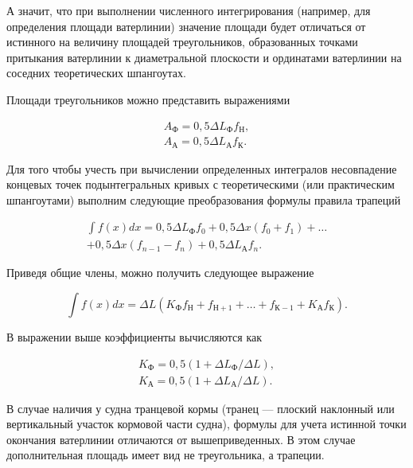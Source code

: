 А значит, что при выполнении численного интегрирования (например, для определения площади ватерлинии) значение площади будет отличаться от истинного на величину площадей треугольников, образованных точками притыкания ватерлинии к диаметральной плоскости и ординатами ватерлинии на соседних теоретических шпангоутах.

Площади треугольников можно представить выражениями

\begin{equation}
    \begin{split}
    A_{\text{Ф}} = 0{,}5 \Delta L_{\text{Ф}} f_{\text{Н}}, \\
    A_{\text{А}} = 0{,}5 \Delta L_{\text{А}} f_{\text{К}}.
    \end{split}
\end{equation}

Для того чтобы учесть при вычислении определенных интегралов несовпадение концевых точек подынтегральных кривых с теоретическими (или практическим шпангоутами) выполним следующие преобразования формулы правила трапеций

\begin{equation}
    \begin{split}
    \int f(x) dx = 0{,}5 \Delta L_{\text{Ф}} f_0 + 0{,}5 \Delta x (f_0 + f_1) + \dots \\
    + 0{,}5 \Delta x (f_{n-1} - f_n) + 0{,}5 \Delta L_{\text{А}} f_n.
    \end{split}
\end{equation}

Приведя общие члены, можно получить следующее выражение

\begin{equation}
    \int f(x) dx = \Delta L (K_{\text{Ф}} f_{\text{Н}} + f_{\text{Н}+1} + \dots + f_{\text{К}-1} + K_{\text{А}} f_{\text{К}}).
\end{equation}

В выражении выше коэффициенты вычисляются как

\begin{equation}
    \begin{split}
    K_{\text{Ф}} = 0{,}5 (1 + \Delta L_{\text{Ф}} / \Delta L), \\
    K_{\text{А}} = 0{,}5 (1 + \Delta L_{\text{А}} / \Delta L).
    \end{split}
\end{equation}

В случае наличия у судна транцевой кормы (транец --- плоский наклонный или вертикальный участок кормовой части судна), формулы для учета истинной точки окончания ватерлинии отличаются от вышеприведенных.
В этом случае дополнительная площадь имеет вид не треугольника, а трапеции.

